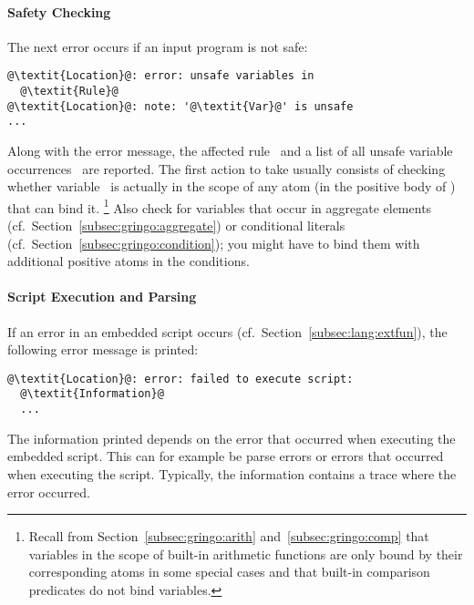 \paragraph{Safety Checking}
The next error occurs if an input program is not safe:
%
\begin{lstlisting}[numbers=none,escapechar=@]
@\textit{Location}@: error: unsafe variables in
  @\textit{Rule}@
@\textit{Location}@: note: '@\textit{Var}@' is unsafe
...
\end{lstlisting}
%
Along with the error message,
the affected rule~ and a list of all unsafe variable occurrences~ are reported.
The first action to take usually consists of checking whether
variable~ is actually in the scope of any atom
(in the positive body of ) that can bind it.%
\footnote{%
  Recall from Section~\ref{subsec:gringo:arith} and~\ref{subsec:gringo:comp}
  that variables in the scope of built-in arithmetic functions are only bound by their corresponding atoms in some special cases 
  and that built-in comparison predicates do not bind variables.}
Also check for variables that occur in aggregate elements (cf.\ Section~\ref{subsec:gringo:aggregate}) or conditional literals (cf.\ Section~\ref{subsec:gringo:condition});
you might have to bind them with additional positive atoms in the conditions.

\paragraph{Script Execution and Parsing}
If an error in an embedded script occurs (cf.~Section~\ref{subsec:lang:extfun}), the following error message is printed:
%
\begin{lstlisting}[numbers=none,escapechar=@]
@\textit{Location}@: error: failed to execute script:
  @\textit{Information}@
  ...
\end{lstlisting}
%
The information printed depends on the error that occurred when executing the embedded script.
This can for example be parse errors or errors that occurred when executing the script.
Typically, the information contains a trace where the error occurred.


